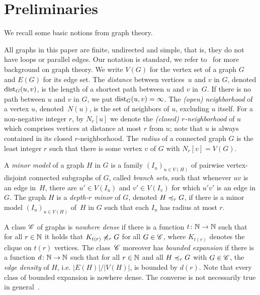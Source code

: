 \section{Preliminaries}\label{sec:prelim}
We recall some basic notions from graph theory.

All graphs in this paper are finite, undirected and simple,
that is, they do not have loops or parallel edges. Our notation is
standard, we refer to~\cite{diestel2012graph} for more background on
graph theory.  We write $V(G)$ for the vertex set of a graph $G$ and
$E(G)$ for its edge set.  The {\em{distance}} between vertices~$u$ and
$v$ in $G$, denoted $\mathrm{dist}_G(u,v)$, is the length of a shortest path
between $u$ and $v$ in~$G$.  If there is no path between $u$ and $v$
in $G$, we put $\mathrm{dist}_G(u,v)=\infty$.  The {\em{(open) neighborhood}}
of a vertex $u$, denoted~$N(u)$, is the set of neighbors of $u$,
excluding $u$ itself.  For a non-negative integer $r$, by $N_r[u]$ we
denote the {\em{(closed) $r$-neighborhood}} of $u$ which comprises
vertices at distance at most $r$ from $u$; note that $u$ is always
contained in its closed $r$-neighborhood. The \emph{radius} of a
connected graph $G$ is the least integer $r$ such that there is some
vertex $v$ of $G$ with $N_r[v]=V(G)$.


A {\em{minor model}} of a graph $H$ in $G$ is a family
$(I_u)_{u\in V(H)}$ of pairwise vertex-disjoint connected subgraphs of
$G$, called {\em{branch sets}}, such that whenever $uv$ is an edge
in~$H$, there are $u'\in V(I_u)$ and $v'\in V(I_v)$ for which $u'v'$
is an edge in $G$.  The graph $H$ is a {\em{depth-$r$ minor}} of $G$,
denoted $H\preccurlyeq_rG$, if there is a minor model $(I_u)_{u\in V(H)}$
of~$H$ in $G$ such that each $I_u$ has radius at most $r$.

A class $\mathscr{C}$ of graphs is \emph{nowhere dense} if there is a
function $t\colon \mathbb{N}\rightarrow \mathbb{N}$ such that for all $r\in \mathbb{N}$ it
holds that $K_{t(r)}\not\preccurlyeq_r G$ for all $G\in \mathscr{C}$, where
$K_{t(r)}$ denotes the clique on $t(r)$ vertices.  The class~$\mathscr{C}$
moreover has \emph{bounded expansion} if there is a function
$d\colon\mathbb{N}\rightarrow\mathbb{N}$ such that for all $r\in \mathbb{N}$ and all
$H\preccurlyeq_rG$ with $G\in\mathscr{C}$, the {\em{edge density}} of $H$,
i.e. $|E(H)|/|V(H)|$, is bounded by $d(r)$. Note that every class of
bounded expansion is nowhere dense. The converse is not necessarily
true in general~\cite{sparsity}.


